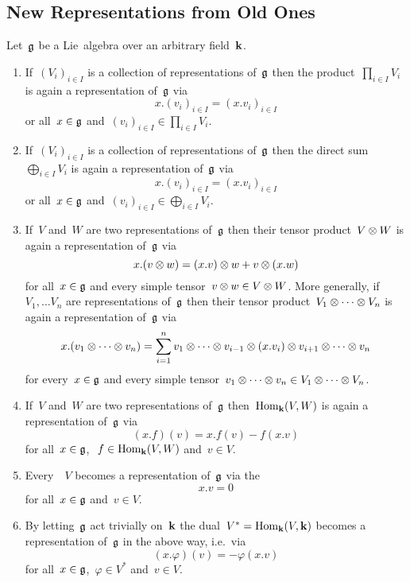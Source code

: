 \subsection{New Representations from Old Ones}


\begin{proposition}
  \label{new representations from old ones}
  Let~$\mathfrak{g}$ be a Lie~algebra over an arbitrary field~$\kf$.
  \begin{enumerate}
    \item
      If~$(V_i)_{i \in I}$ is a collection of representations of~$\mathfrak{g}$ then the product~$\prod_{i \in I} V_i$ is again a representation of~$\mathfrak{g}$ via
      \[
        x.(v_i)_{i \in I}
        =
        ( x.v_i )_{i \in I}
      \]
      or all~$x \in \mathfrak{g}$ and~$(v_i)_{i \in I} \in \prod_{i \in I} V_i$.
    \item
      If~$(V_i)_{i \in I}$ is a collection of representations of~$\mathfrak{g}$ then the direct sum~$\bigoplus_{i \in I} V_i$ is again a representation of~$\mathfrak{g}$ via
      \[
        x.(v_i)_{i \in I}
        =
        ( x.v_i )_{i \in I}
      \]
      or all~$x \in \mathfrak{g}$ and~$(v_i)_{i \in I} \in \bigoplus_{i \in I} V_i$.
    \item
      If~$V$ and~$W$ are two representations of~$\mathfrak{g}$ then their tensor product~$V \otimes W$ is again a representation of~$\mathfrak{g}$ via
      \[
        x.(v \otimes w)
        =
        (x.v) \otimes w + v \otimes (x.w)
      \]
      for all~$x \in \mathfrak{g}$ and every simple tensor~$v \otimes w \in V \otimes W$.
      More generally, if~$V_1, \dotsc V_n$ are representations of~$\mathfrak{g}$ then their tensor product~$V_1 \otimes \dotsb \otimes V_n$ is again a representation of~$\mathfrak{g}$ via
      \[
        x.(v_1 \otimes \dotsb \otimes v_n)
        = \sum_{i=1}^n
                  v_1
          \otimes \dotsb
          \otimes v_{i-1}
          \otimes (x.v_i)
          \otimes v_{i+1}
          \otimes \dotsb
          \otimes v_n
      \]
      for every~$x \in \mathfrak{g}$ and every simple tensor~$v_1 \otimes \dotsb \otimes v_n \in V_1 \otimes \dotsb \otimes V_n$.
    \item
      If~$V$ and~$W$ are two representations of~$\mathfrak{g}$ then~$\operatorname{Hom}_{\mathbf{k}}(V,W)$ is again a representation of~$\mathfrak{g}$ via
      \[
        (x.f)(v)
        =
        x.f(v) - f(x.v)
      \]
      for all~$x \in \mathfrak{g}$,\,~$f \in \operatorname{Hom}_{\mathbf{k}}(V,W)$ and~$v \in V$.
    \item
      Every~{\vectorspace{$\kf$}}~$V$ becomes a representation of~$\mathfrak{g}$ via the 
      \[
        x.v
        =
        0
      \]
      for all~$x \in \mathfrak{g}$ and~$v \in V$.
    \item
      By letting~$\mathfrak{g}$ act trivially on~$\kf$ the dual~$V^* = \operatorname{Hom}_{\mathbf{k}}(V, \mathbf{k})$ becomes a representation of~$\mathfrak{g}$ in the above way, i.e.\ via
      \[
        (x.\varphi)(v)
        =
        -\varphi(x.v)
      \]
      for all~$x \in \mathfrak{g}$,~$\varphi \in V^*$ and~$v \in V$.
  \end{enumerate}
\end{proposition}



